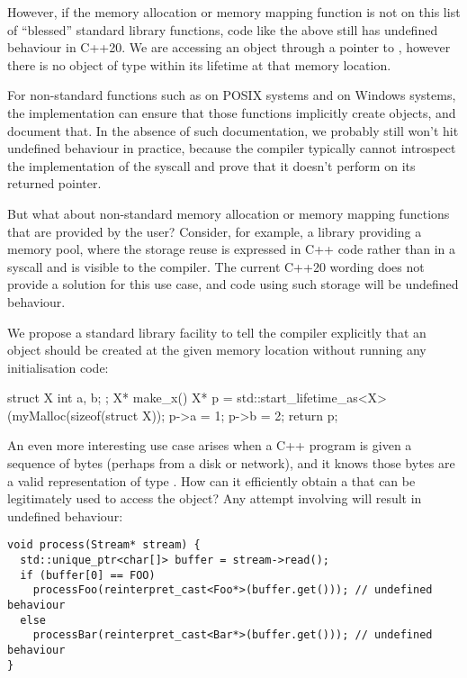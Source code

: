 However, if the memory allocation or memory mapping function is not on this list of ``blessed'' standard library functions, code like the above still has undefined behaviour in C++20. We are accessing an object through a pointer to , however there is no object of type  within its lifetime at that memory location.

For non-standard functions such as  on POSIX systems and  on Windows systems, the implementation can ensure that those functions implicitly create objects, and document that. In the absence of such documentation, we probably still won't hit undefined behaviour in practice, because the compiler typically cannot introspect the implementation of the syscall and prove that it doesn't perform  on its returned pointer.

But what about non-standard memory allocation or memory mapping functions that are provided by the user? Consider, for example, a library providing a memory pool, where the storage reuse is expressed in C++ code rather than in a syscall and is visible to the compiler. The current C++20 wording does not provide a solution for this use case, and code using such storage will be undefined behaviour.

We propose a standard library facility \mbox{} to tell the compiler explicitly that an object should be created at the given memory location without running any initialisation code:

\begin{codeblock}
struct X { int a, b; };
X* make_x() {
  X* p = std::start_lifetime_as<X>(myMalloc(sizeof(struct X));
  p->a = 1;
  p->b = 2;
  return p;
}
\end{codeblock}

An even more interesting use case arises when a C++ program is given a sequence of bytes (perhaps from a disk or network), and it knows those bytes are a valid representation of type . How can it efficiently obtain a  that can be legitimately used to access the object? Any attempt involving  will result in undefined behaviour:

\begin{lstlisting}
void process(Stream* stream) {
  std::unique_ptr<char[]> buffer = stream->read();
  if (buffer[0] == FOO)
    processFoo(reinterpret_cast<Foo*>(buffer.get())); // undefined behaviour
  else
    processBar(reinterpret_cast<Bar*>(buffer.get())); // undefined behaviour
}
\end{lstlisting}

